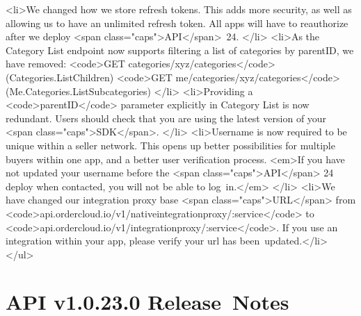 \documentclass{memoir}%
\begin{document}
<li>We changed how we store refresh tokens. This adds more security, as well as allowing us to have an unlimited refresh token. All apps will have to reauthorize after we deploy <span class="caps">API</span>~24. </li>\newline%
<li>As the Category List endpoint now supports filtering a list of categories by parentID, we have removed: <code>GET categories/xyz/categories</code> (Categories.ListChildren) <code>GET me/categories/xyz/categories</code> (Me.Categories.ListSubcategories) </li>\newline%
<li>Providing a <code>parentID</code> parameter explicitly in Category List is now redundant. Users should check that you are using the latest version of your <span class="caps">SDK</span>. </li>\newline%
<li>Username is now required to be unique within a seller network. This opens up better possibilities for multiple buyers within one app, and a better user verification process. <em>If you have not updated your username before the <span class="caps">API</span> 24 deploy when contacted, you will not be able to log~in.</em> </li>\newline%
<li>We have changed our integration proxy base <span class="caps">URL</span> from <code>api.ordercloud.io/v1/nativeintegrationproxy/:service</code> to <code>api.ordercloud.io/v1/integrationproxy/:service</code>. If you use an integration within your app, please verify your url has been~updated.</li>\newline%
</ul>

%
\section*{API v1.0.23.0 Release~Notes}%
\paragraph*{}%

%
\end{document}
